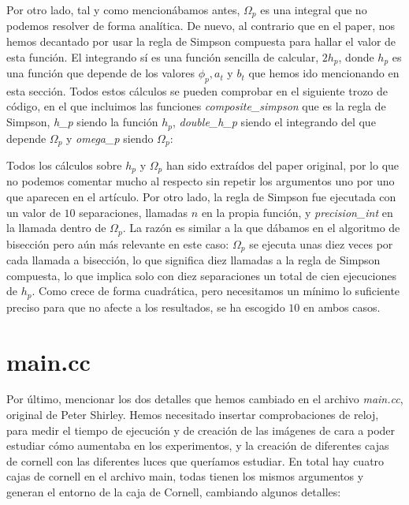 \documentclass{scrbook}
\begin{document}
Por otro lado, tal y como mencionábamos antes, $\Omega_p$ es una integral que no podemos resolver de forma analítica. De nuevo, al contrario que en el paper, nos hemos decantado por usar la regla de Simpson compuesta para hallar el valor de esta función. El integrando sí es una función sencilla de calcular, $2h_p$, donde $h_p$ es una función que depende de los valores $\phi_p, a_t$ y $b_t$ que hemos ido mencionando en esta sección. Todos estos cálculos se pueden comprobar en el siguiente trozo de código, en el que incluimos las funciones \textit{composite\_simpson} que es la regla de Simpson, \textit{h\_p} siendo la función $h_p$, \textit{double\_h\_p} siendo el integrando del que depende $\Omega_p$ y \textit{omega\_p} siendo $\Omega_p$:


Todos los cálculos sobre $h_p$ y $\Omega_p$ han sido extraídos del paper original, por lo que no podemos comentar mucho al respecto sin repetir los argumentos uno por uno que aparecen en el artículo. Por otro lado, la regla de Simpson fue ejecutada con un valor de $10$ separaciones, llamadas $n$ en la propia función, y \textit{precision\_int} en la llamada dentro de $\Omega_p$. La razón es similar a la que dábamos en el algoritmo de bisección pero aún más relevante en este caso: $\Omega_p$ se ejecuta unas diez veces por cada llamada a bisección, lo que significa diez llamadas a la regla de Simpson compuesta, lo que implica solo con diez separaciones un total de cien ejecuciones de $h_p$. Como crece de forma cuadrática, pero necesitamos un mínimo lo suficiente preciso para que no afecte a los resultados, se ha escogido $10$ en ambos casos. 


\section{main.cc}
Por último, mencionar los dos detalles que hemos cambiado en el archivo \textit{main.cc}, original de Peter Shirley. Hemos necesitado insertar comprobaciones de reloj, para medir el tiempo de ejecución y de creación de las imágenes de cara a poder estudiar cómo aumentaba en los experimentos, y la creación de diferentes cajas de cornell con las diferentes luces que queríamos estudiar. En total hay cuatro cajas de cornell en el archivo main, todas tienen los mismos argumentos y generan el entorno de la caja de Cornell, cambiando algunos detalles:
\end{document}
